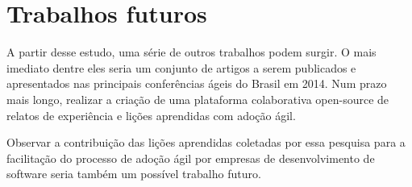 \section{Trabalhos futuros}

A partir desse estudo, uma série de outros trabalhos podem surgir. O mais imediato dentre eles seria um conjunto de artigos a serem publicados e apresentados nas principais conferências ágeis do Brasil em 2014. Num prazo mais longo, realizar a criação de uma plataforma colaborativa open-source de relatos de experiência e lições aprendidas com adoção ágil.

Observar a contribuição das lições aprendidas coletadas por essa pesquisa para a facilitação do processo de adoção ágil por empresas de desenvolvimento de software seria também um possível trabalho futuro.
